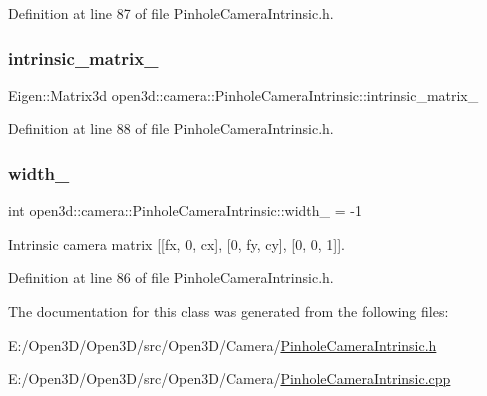 Definition at line 87 of file Pinhole\+Camera\+Intrinsic.\+h.

\mbox{\label{classopen3d_1_1camera_1_1_pinhole_camera_intrinsic_aaec6ac584fd3b3cc97f21824cc3581bd}} 
\subsubsection{\texorpdfstring{intrinsic\_matrix\_}{intrinsic\_matrix\_}}
{\footnotesize\ttfamily Eigen\+::\+Matrix3d open3d\+::camera\+::\+Pinhole\+Camera\+Intrinsic\+::intrinsic\+\_\+matrix\+\_\+}



Definition at line 88 of file Pinhole\+Camera\+Intrinsic.\+h.

\mbox{\label{classopen3d_1_1camera_1_1_pinhole_camera_intrinsic_a1cd741802818785dcc04ca191c0f6b83}} 
\subsubsection{\texorpdfstring{width\_}{width\_}}
{\footnotesize\ttfamily int open3d\+::camera\+::\+Pinhole\+Camera\+Intrinsic\+::width\+\_\+ = -\/1}



Intrinsic camera matrix \mbox{[}\mbox{[}fx, 0, cx\mbox{]}, \mbox{[}0, fy, cy\mbox{]}, \mbox{[}0, 0, 1\mbox{]}\mbox{]}. 



Definition at line 86 of file Pinhole\+Camera\+Intrinsic.\+h.



The documentation for this class was generated from the following files\+:\begin{DoxyCompactItemize}
\item 
E\+:/\+Open3\+D/\+Open3\+D/src/\+Open3\+D/\+Camera/\mbox{\hyperlink{_pinhole_camera_intrinsic_8h}{Pinhole\+Camera\+Intrinsic.\+h}}\item 
E\+:/\+Open3\+D/\+Open3\+D/src/\+Open3\+D/\+Camera/\mbox{\hyperlink{_pinhole_camera_intrinsic_8cpp}{Pinhole\+Camera\+Intrinsic.\+cpp}}\end{DoxyCompactItemize}
